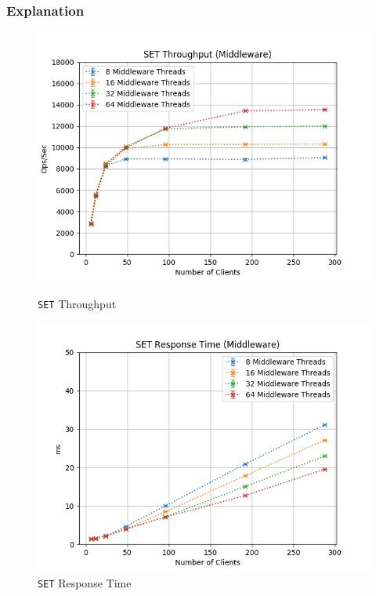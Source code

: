 \documentclass[11pt,a4paper]{article}
\begin{document}
\subsubsection{Explanation}
%
\begin{figure}[H]
	\centering
	\captionsetup{width=0.4\textwidth}
    \begin{minipage}{0.5\textwidth}
        \centering
        \includegraphics[width=\textwidth]{../illustrations/plots/3_1_full_system_write/1-0/middleware_set_tp_s.png}
        \caption{\texttt{SET} Throughput}
        \label{fig:full_system_write_set_tp_mw}
    \end{minipage}\hfill
    \begin{minipage}{0.5\textwidth}
        \centering
        \includegraphics[width=\textwidth]{../illustrations/plots/3_1_full_system_write/1-0/middleware_set_rt_ms.png}
        \caption{\texttt{SET} Response Time}
        \label{fig:full_system_write_set_rt_mw}
    \end{minipage}
\end{figure}
\end{document}
